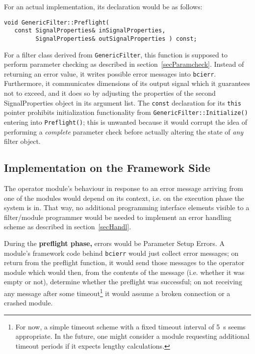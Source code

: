 \documentclass[12pt,a4paper]{article}
\begin{document}
For an actual implementation, its declaration would be as follows:
\begin{verbatim}
void GenericFilter::Preflight(
   const SignalProperties& inSignalProperties,
         SignalProperties& outSignalProperties ) const;
\end{verbatim}

For a filter class derived from
\texttt{GenericFilter}, this function is supposed to perform
parameter checking as described in section~\ref{secParamcheck}.
Instead of returning an error value, it writes possible error
messages into \texttt{bcierr}.
Furthermore, it communicates dimensions of its output signal
which it guarantees not to exceed, and it does so by adjusting
the properties of the second SignalProperties object in its
argument list.
The \texttt{const} declaration for its \texttt{this} pointer
prohibits initialization functionality from
\texttt{GenericFilter::Initialize()} entering into
\texttt{Preflight()}; this is unwanted because it would
corrupt the idea of performing a \textit{complete} parameter check
before actually altering the state of \textit{any}
filter object.

\subsection{Implementation on the Framework Side}
\label{secImpl}

The operator module's behaviour in response to an error
message arriving from one of the modules would depend
on its context, i.e. on the execution phase the system is in.
That way, no additional programming interface elements
visible to a filter/module programmer
would be needed to implement an error handling scheme as
described in section~\ref{secHandl}. 

During the \textbf{preflight phase,} errors would be {Parameter
Setup Errors.} A module's framework code behind
\texttt{bcierr} would just collect error
messages; on return from the preflight function, it would
send those messages to the operator module which would then,
from the contents of the message (i.e. whether it was empty
or not), determine whether the preflight was successful;
on not receiving any message after some timeout\footnote{
For now, a simple timeout scheme with a fixed timeout
interval of 5~s seems appropriate. In the future, one might consider
a module requesting additional timeout periods if it expects 
lengthy calculations.}
it would assume a broken connection or a crashed module.
\end{document}
